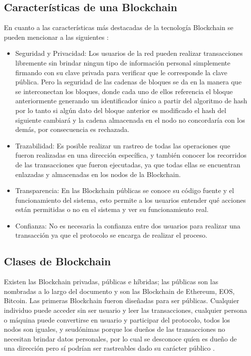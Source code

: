 \subsection{Características de una Blockchain}

En cuanto a las características más destacadas de la tecnología Blockchain se pueden mencionar a las siguientes \cite[]{torres_Blockchain_nodate}:

\begin{itemize}
    \item Seguridad y Privacidad: Los usuarios de la red pueden realizar transacciones libremente sin brindar ningun tipo de información personal
    simplemente firmando con su clave privada para verificar que le corresponde la clave pública. Pero la seguridad de las cadenas de bloques se da en la manera que
    se interconectan los bloques, donde cada uno de ellos referencia el bloque anteriormente generando un identificador único a partir del algoritmo de hash por lo tanto si algún dato del 
    bloque anterior es modificado el hash del siguiente  cambiará y 
    la cadena almacenada en el nodo no concordaría con los demás, por consecuencia es rechazada.  
    
    \item Trazabilidad: Es posible realizar un rastreo de todas las operaciones que fueron realizadas en una dirección específica, y también conocer 
  los recorridos de las transacciones que fueron ejecutadas, ya que todas ellas se encuentran enlazadas y 
    almacenadas en los nodos de la Blockchain. 

    \item Transparencia: En las  Blockchain públicas se conoce  su código fuente y el funcionamiento del sistema, esto permite 
    a los usuarios entender qué acciones están permitidas o no en el sistema y ver su funcionamiento real.
    
    \item Confianza: No es necesaria la confianza entre dos usuarios para realizar una transacción ya que el protocolo se encarga de realizar 
    el proceso.

    \end{itemize}

\subsection{Clases de Blockchain}
Existen las  Blockchain privadas, públicas e híbridas; las públicas son las nombradas a lo largo del documento y son las  Blockchain de Ethereum, EOS, Bitcoin. 
Las primeras  Blockchain fueron diseñadas para ser públicas. Cualquier individuo puede acceder sin ser usuario y leer las transacciones, cualquier 
persona o máquina puede convertirse en usuario y participar del protocolo,  todos los nodos son iguales, y seudónimas 
porque los dueños de las transacciones no necesitan brindar  datos personales, por lo cual se desconoce quíen es dueño de una dirección pero sí podrían ser
rastreables dado su carácter público \cite[]{preukschat_Blockchain_2018}.  

